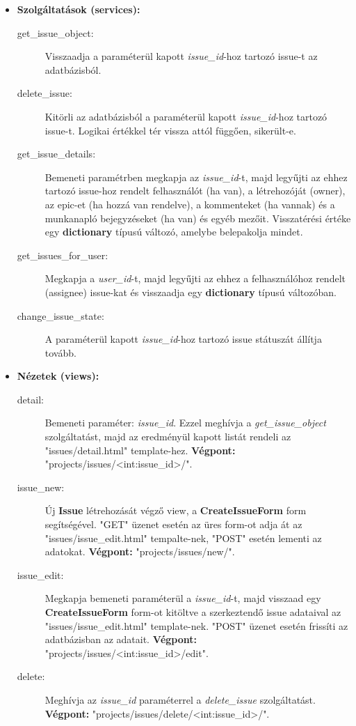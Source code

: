 \begin{itemize}
	\item \textbf{Szolgáltatások (services):}
	\begin{description}
		\item[get\_issue\_object:] Visszaadja a paraméterül kapott \textit{issue\_id}-hoz tartozó issue-t az adatbázisból.
		\item[delete\_issue:] Kitörli az adatbázisból a paraméterül kapott \textit{issue\_id}-hoz tartozó issue-t. Logikai értékkel tér vissza attól függően, sikerült-e.
		\item[get\_issue\_details:] Bemeneti paramétrben megkapja az  \textit{issue\_id}-t, majd legyűjti az ehhez tartozó issue-hoz rendelt felhasználót (ha van), a létrehozóját (owner), az epic-et (ha hozzá van rendelve), a kommenteket (ha vannak) és a munkanapló bejegyzéseket (ha van) és egyéb mezőit. Visszatérési értéke egy \textbf{dictionary} típusú változó, amelybe belepakolja mindet.
		\item[get\_issues\_for\_user:] Megkapja a \textit{user\_id}-t, majd legyűjti az ehhez a felhasználóhoz rendelt (assignee) issue-kat és visszaadja egy \textbf{dictionary} típusú változóban.
		\item[change\_issue\_state:] A paraméterül kapott \textit{issue\_id}-hoz tartozó issue státuszát állítja tovább.
	\end{description}
	\item \textbf{Nézetek (views):}
	\begin{description}
		\item[detail:] Bemeneti paraméter: \textit{issue\_id}. Ezzel meghívja a \textit{get\_issue\_object} szolgáltatást, majd az eredményül kapott listát rendeli az "issues/detail.html" template-hez. \textbf{Végpont:} "projects/issues/<int:issue\_id>/".
		\item[issue\_new:] Új \textbf{Issue} létrehozását végző view, a \textbf{CreateIssueForm} form segítségével. "GET" üzenet esetén az üres form-ot adja át az "issues/issue\_edit.html" tempalte-nek, "POST" esetén lementi az adatokat. \textbf{Végpont:} "projects/issues/new/".
		\item[issue\_edit:] Megkapja bemeneti paraméterül a \textit{issue\_id}-t, majd visszaad egy \textbf{CreateIssueForm} form-ot kitöltve a szerkeztendő issue adataival az "issues/issue\_edit.html" template-nek. "POST" üzenet esetén frissíti az adatbázisban az adatait. \textbf{Végpont:} "projects/issues/<int:issue\_id>/edit".
		\item[delete:] Meghívja az \textit{issue\_id} paraméterrel a \textit{delete\_issue} szolgáltatást. \textbf{Végpont:} "projects/issues/delete/<int:issue\_id>/".

\end{description}
\end{itemize}
